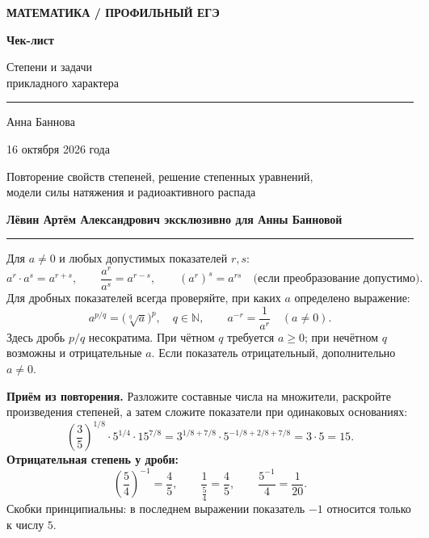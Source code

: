\documentclass[a4paper,12pt]{article}
\newcommand{\sect}[1]{\vspace{6pt}{\large\bfseries\color{darkaccent}#1}\par\vspace{3pt}\noindent\color{lightline}\rule{\linewidth}{0.5pt}\color{black}\vspace{2pt}}
\newcommand{\keyphrase}[1]{{\color{accent}\bfseries #1}}
\begin{document}
\thispagestyle{empty}
\begin{center}
\vspace*{34mm}
{\small\bfseries\color{accent} МАТЕМАТИКА \quad / \quad ПРОФИЛЬНЫЙ ЕГЭ}\par
\vspace{15mm}
{\fontsize{31}{38}\selectfont\bfseries\color{darkaccent}Чек-лист}\par
\vspace{4mm}
{\fontsize{20}{27}\selectfont Степени и задачи\\прикладного характера}\par
\vspace{16mm}
{\color{lightline}\rule{94mm}{0.7pt}}\par
\vspace{13mm}
{\large Анна Баннова}\par
\vspace{3mm}
{\normalsize 16 октября 2026 года}\par
\vspace{25mm}
{\small\color{textgray}Повторение свойств степеней, решение степенных уравнений,\\модели силы натяжения и радиоактивного распада}\par
\vfill
{\small\bfseries\color{darkaccent}Лёвин Артём Александрович эксклюзивно для Анны Банновой}\par
\vspace{8mm}
\end{center}
\clearpage

\sect{01\quad Работа со степенями}
Для $a\ne0$ и любых допустимых показателей $r,s$:
\[
 a^r\cdot a^s=a^{r+s},\qquad
 \frac{a^r}{a^s}=a^{r-s},\qquad
 (a^r)^s=a^{rs}\quad\text{(если преобразование допустимо)}.
\]
Для дробных показателей всегда проверяйте, при каких $a$ определено выражение:
\[
 a^{p/q}=\bigl(\sqrt[q]{a}\bigr)^p,\quad q\in\mathbb N,\qquad
 a^{-r}=\frac1{a^r}\quad(a\ne0).
\]
Здесь дробь $p/q$ несократима. При чётном $q$ требуется $a\ge0$; при нечётном $q$ возможны и отрицательные $a$. Если показатель отрицательный, дополнительно $a\ne0$.

\keyphrase{Приём из повторения.} Разложите составные числа на множители, раскройте произведения степеней, а затем сложите показатели при одинаковых основаниях:
\[
\left(\frac35\right)^{1/8}\!\cdot5^{1/4}\cdot15^{7/8}
=3^{1/8+7/8}\cdot5^{-1/8+2/8+7/8}
=3\cdot5=15.
\]
\textbf{Отрицательная степень у дроби:}
\[
\left(\frac54\right)^{-1}=\frac45,
\qquad \frac{1}{\frac54}=\frac45,
\qquad \frac{5^{-1}}{4}=\frac1{20}.
\]
Скобки принципиальны: в последнем выражении показатель $-1$ относится только к числу $5$.
\end{document}
